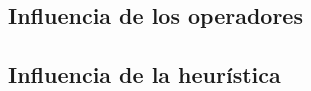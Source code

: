 \documentclass{article}
\begin{document}
\subsection{Influencia de los operadores}

\subsection{Influencia de la heurística}
\end{document}
